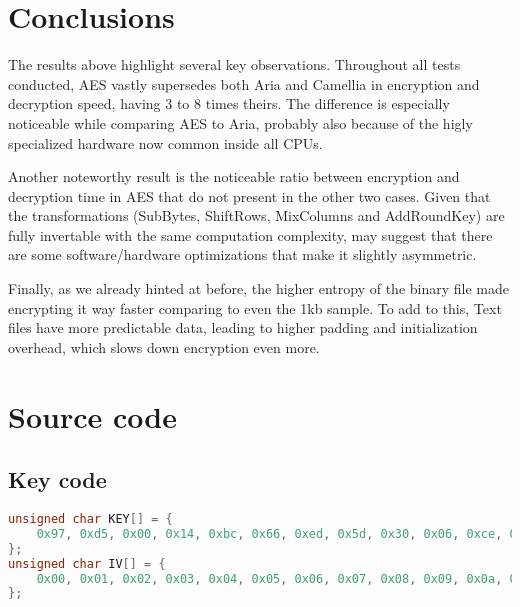 \documentclass{article}
\begin{document}
\section{Conclusions}
The results above highlight several key observations. Throughout all tests conducted, AES vastly supersedes both Aria and Camellia in encryption and decryption speed, having 3 to 8 times theirs. The difference is especially noticeable while comparing AES to Aria, probably also because of the higly specialized hardware now common inside all CPUs.

Another noteworthy result is the noticeable ratio between encryption and decryption time in AES that do not present in the other two cases. Given that the transformations (SubBytes, ShiftRows, MixColumns and AddRoundKey) are fully invertable with the same computation complexity, may suggest that there are some software/hardware optimizations that make it slightly asymmetric.

Finally, as we already hinted at before, the higher entropy of the binary file made encrypting it way faster comparing to even the 1kb sample. To add to this, Text files have more predictable data, leading to higher padding and initialization overhead, which slows down encryption even more.
\newpage
\section{Source code}
\subsection{Key code}
\begin{lstlisting}[language=C]
unsigned char KEY[] = {
    0x97, 0xd5, 0x00, 0x14, 0xbc, 0x66, 0xed, 0x5d, 0x30, 0x06, 0xce, 0x15, 0x5c, 0xa9, 0xe9, 0x39
};
unsigned char IV[] = {
    0x00, 0x01, 0x02, 0x03, 0x04, 0x05, 0x06, 0x07, 0x08, 0x09, 0x0a, 0x0b, 0x0c, 0x0d, 0x0e, 0x0f
};
\end{lstlisting}
\end{document}
